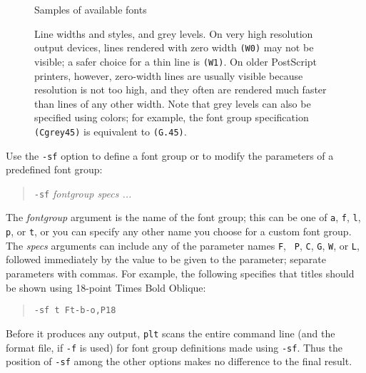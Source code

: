 \documentclass{book}
\begin{document}
\begin{figure}
\begin{center}
\end{center}
\caption{Samples of available fonts \label{fig:fonts}}
\end{figure}

\begin{figure}
\begin{center}
\end{center}
\caption[Line styles and grey levels]{Line widths and styles, and grey
levels.  On very high resolution output devices, lines rendered with
zero width {\tt (W0)} may not be visible; a safer choice for a thin
line is {\tt (W1)}.  On older PostScript printers, however, zero-width lines
are usually visible because resolution is not too high, and they often
are rendered much faster than lines of any other width.  Note that
grey levels can also be specified using colors; for example, the
font group specification {\tt (Cgrey45)} is equivalent to {\tt (G.45)}.
\label{fig:linestyles}}
\end{figure}

%
Use the {\tt -sf} option to define a font group or to modify the
parameters of a predefined font group:

\begin{quote}
{\tt -sf} {\em fontgroup specs ...}
\end{quote}

The {\em fontgroup} argument is the name of the font group; this can
be one of {\tt a}, {\tt f}, {\tt l}, {\tt p}, or {\tt t}, or you can
specify any other name you choose for a custom font group.  The {\em
specs} arguments can include any of the parameter names {\tt F}, {\tt
P}, {\tt C}, {\tt G}, {\tt W}, or {\tt L}, followed immediately by the
value to be given to the parameter;  separate parameters with commas.
For example, the following specifies that titles should be shown using
18-point Times Bold Oblique:

\begin{quote}
{\tt -sf t Ft-b-o,P18}
\end{quote}

%
Before it produces any output, {\tt plt} scans the entire command line
(and the format file, if {\tt -f} is used) for font group definitions
made using {\tt -sf}.  Thus the position of {\tt -sf} among the other
options makes no difference to the final result.
\end{document}
